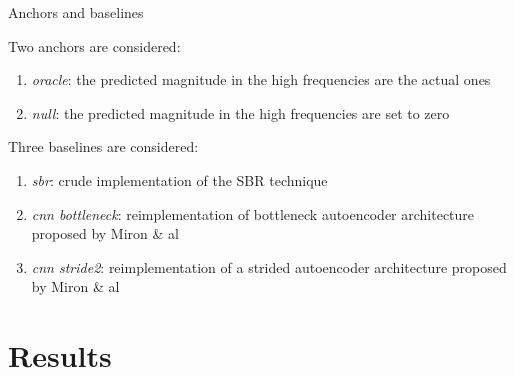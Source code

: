 \documentclass[compress]{beamer}
\begin{document}
\begin{frame}{Anchors and baselines}

Two anchors are considered:
\begin{enumerate}
  \item \textit{oracle}: the predicted magnitude in the high frequencies are the actual ones
  \item \textit{null}: the predicted magnitude in the high frequencies are set to zero
\end{enumerate}

Three baselines are considered:
\begin{enumerate}
  \item \textit{sbr}: crude implementation of the SBR technique
  \item \textit{cnn bottleneck}: reimplementation of bottleneck autoencoder architecture proposed by Miron \& al
  \item \textit{cnn stride2}: reimplementation of a strided autoencoder architecture proposed by Miron \& al 
\end{enumerate}
\end{frame}

\section{Results}
\end{document}
